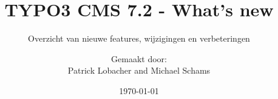%

%
%

\documentclass[t]{beamer}

\beamertemplatenavigationsymbolsempty

{
	\usetheme{typo3slides}
}

\title{TYPO3 CMS 7.2 - What's new}
\subtitle{Overzicht van nieuwe features, wijzigingen en verbeteringen}
\author{
	\centerline{Gemaakt door:}
	\centerline{Patrick Lobacher and Michael Schams}
}

\date{\today}



\sharefont


\begingroup
	[default]
	\begin{frame}
		\titlepage
	\end{frame}
\endgroup


\section*{TYPO3 CMS 7.2 - What's New}
\begin{frame}[fragile]
	\frametitle{Overzicht hoofdstukken}
	\framesubtitle{Overzicht hoofdstukken}

	\begin{multicols}{2}
		\tableofcontents
	\end{multicols}

\end{frame}

